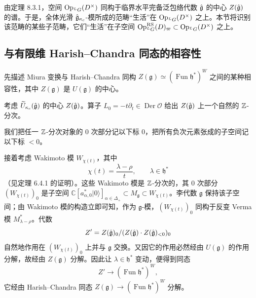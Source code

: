 由定理 8.3.1，空间 $\operatorname{Op}_{{}^LG}(D^\times)$ 同构于临界水平完备泛包络代数 $\hat{\mathfrak{g}}$ 的中心 $Z(\hat{\mathfrak{g}})$ 的谱。于是，全体光滑 $\hat{\mathfrak{g}}_{\kappa_c}$-模所成的范畴“生活”在 $\operatorname{Op}_{{}^LG}(D^\times)$ 之上。本节将识别该范畴的某些子范畴，它们“生活”在子空间 $\operatorname{Op}^{\mathrm{RS}}_{{}^LG}(D)_\varpi\subset\operatorname{Op}_{{}^LG}(D^\times)$ 之上。

\subsection{与有限维 Harish--Chandra 同态的相容性}

先描述 Miura 变换与 Harish--Chandra 同构 $Z(\mathfrak{g})\simeq(\operatorname{Fun}\mathfrak{h}^*)^W$ 之间的某种相容性，其中 $Z(\mathfrak{g})$ 是 $U(\mathfrak{g})$ 的中心。

考虑 $\widetilde{U}_{\kappa_c}(\hat{\mathfrak{g}})$ 的中心 $Z(\hat{\mathfrak{g}})$。算子 $L_0=-t\partial_t\in\operatorname{Der}\mathcal{O}$ 给出 $Z(\hat{\mathfrak{g}})$ 上一个自然的 $\mathbb{Z}$-分次。

我们把任一 $\mathbb{Z}$-分次对象的 0 次部分记以下标 0，把所有负次元素张成的子空间记以下标 $<0$。

接着考虑 Wakimoto 模 $W_{\chi(t)}$，其中
\[
    \chi(t)=\frac{\lambda-\rho}{t},\qquad \lambda\in\mathfrak{h}^*
\]
（见定理 6.4.1 的证明）。这些 Wakimoto 模是 $\mathbb{Z}$-分次的，其 0 次部分 $(W_{\chi(t)})_0$ 是子空间 $\mathbb{C}[a^*_{\alpha,0}|0\rangle]_{\alpha\in\Delta_+}\subset M_{\mathfrak{g}}\subset W_{\chi(t)}$。李代数 $\mathfrak{g}$ 保持该子空间；由 Wakimoto 模的构造立即可知，作为 $\mathfrak{g}$-模，$(W_{\chi(t)})_0$ 同构于反变 Verma 模 $M^*_{\lambda-\rho}$。代数
\[
    Z'=Z(\hat{\mathfrak{g}})_0/(Z(\hat{\mathfrak{g}})\cdot Z(\hat{\mathfrak{g}})_{<0})_0
\]
自然地作用在 $(W_{\chi(t)})_0$ 上并与 $\mathfrak{g}$ 交换。又因它的作用必然经由 $U(\mathfrak{g})$ 的作用分解，故经由 $Z(\mathfrak{g})$ 分解。因此让 $\lambda\in\mathfrak{h}^*$ 变动，便得到同态
\begin{equation}
    Z'\to(\operatorname{Fun}\mathfrak{h}^*)^W,
    \tag{9.4-1}
\end{equation}
它经由 Harish--Chandra 同态 $Z(\mathfrak{g})\to(\operatorname{Fun}\mathfrak{h}^*)^W$ 分解。

